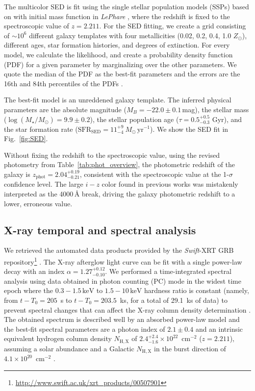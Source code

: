 \documentclass[longauth]{aa}    %
\begin{document}
The multicolor SED is fit using the \citet{Bruzual2003} single stellar
population models (SSPs) based on  \citet{Chabrier2003} with initial mass
function in \emph{LePhare} \citep{Ilbert2006}, where the redshift is fixed to
the spectroscopic value of $z=2.211$. For the SED fitting, we create a grid
consisting of $\sim 10^6$  different galaxy templates with four metallicities
(0.02, 0.2, 0.4, 1.0 $Z_{\odot}$), different ages, star formation histories, and
degrees of extinction. For every model, we calculate the likelihood, and create
a probability density function (PDF) for a given parameter by marginalizing over
the other parameters. We quote the median of the PDF as the best-fit parameters
and the errors are the 16th and 84th percentiles of the PDFs \citep[see, e.g.,
][for details on the SED fitting procedure]{Schulze2016}.

The best-fit model is an unreddened galaxy template. The inferred physical
parameters are the absolute magnitude ($M_B=-22.0\pm0.1$\,mag), the stellar mass
($\log(M_{\star}/M_\odot) = 9.9\pm0.2$), the stellar population age ($\tau =
0.5_{-0.3}^{+0.5}$ Gyr), and the star formation rate
($\mathrm{SFR}_{\mathrm{SED}} = 11_{-4}^{+9}~M_\odot\,\mathrm{yr}^{-1}$). We
show the SED fit in Fig.~\ref{fig:SED}.

Without fixing the redshift to the spectroscopic value, using the revised
photometry from Table~\ref{tab:phot_overview}, the photometric redshift of the
galaxy is $z_{\mathrm{phot}}=2.04_{-0.21}^{+0.19}$, consistent with the
spectroscopic value at the 1-$\sigma$ confidence level. The large $i-z$ color
found in previous works was mistakenly interpreted as the 4000\,\AA{} break,
driving the galaxy photometric redshift to a lower, erroneous value.

\subsection{X-ray temporal and spectral analysis}\label{xray}

We retrieved the automated data products provided by the \textit{Swift}-XRT GRB
repository\footnote{\url{http://www.swift.ac.uk/xrt\_products/00507901}}
\citep{Evans2009}. 
The X-ray afterglow light curve can be fit with a single power-law decay with an
index $\alpha=1.27_{-0.10}^{+0.12}$. We performed a time-integrated spectral
analysis using data obtained in photon counting (PC) mode in the widest time epoch where
the $0.3-1.5\,\mathrm{keV}$ to $1.5-10\,\mathrm{keV}$ hardness ratio is constant
(namely, from $t-T_0 = 205$~s to $t-T_0 = 203.5$~ks, for a total of 29.1~ks of
data) to prevent spectral changes that can affect the X-ray column density
determination \citep{Kopac2012}. 
The obtained spectrum is  described well by an absorbed power-law
model and the best-fit spectral parameters are a photon index of $2.1 \pm 0.4$ and
an intrinsic equivalent hydrogen column density $N_{\mathrm{H,X}}$ of $2.4_{-1.6}^{+2.4}
\times 10^{22}$~cm$^{-2}$ ($z=2.211$), assuming a solar abundance and a Galactic $N_{\mathrm{H,X}}$ in
the burst direction of $4.1 \times 10^{20}$~cm$^{-2}$ \citep{Willingale2013}.
\end{document}

